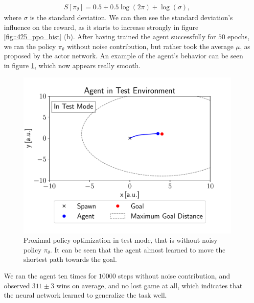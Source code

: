 \begin{align}
	S[\pi_\theta] = 0.5 + 0.5\log(2\pi)+\log(\sigma),
\end{align}
where $\sigma$ is the standard deviation. We can then see the standard deviation's influence on the reward, as it starts to increase strongly in figure \ref{fig::425_ppo_hist} (b). After having trained the agent successfully for $50$ epochs, we ran the policy $\pi_\theta$ without noise contribution, but rather took the average $\mu$, as proposed by the actor network. An example of the agent's behavior can be seen in figure \ref{fig::425_ppo_test}, which now appears really smooth. 
\begin{figure}[h!]
	\centering
	\includegraphics[scale=.45]{chapters/04_experiments/02_autonomous_walking/test_mode.pdf}
	\caption{Proximal policy optimization in test mode, that is without noisy policy $\pi_\theta$. It can be seen that the agent almost learned to move the shortest path towards the goal.}	
	\label{fig::425_ppo_test}
\end{figure}
We ran the agent ten times for $10000$ steps without noise contribution, and observed $311\pm3$ wins on average, and no lost game at all, which indicates that the neural network learned to generalize the task well.